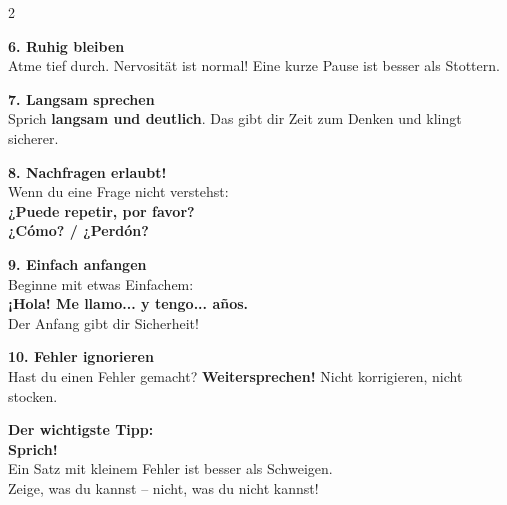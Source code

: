 \documentclass[11pt, a4paper]{article}
\newcommand{\seriftext}[1]{{\fontfamily{ppl}\selectfont #1}}
\newcommand{\es}[1]{\seriftext{\textbf{#1}}}
\newcommand{\tipp}[1]{\textcolor{spanischrot}{\textbf{#1}}}
\begin{document}
\begin{multicols}{2}
\begin{tippbox}
\tipp{6. Ruhig bleiben}\\[2pt]
Atme tief durch. Nervosität ist normal! Eine kurze Pause ist besser als Stottern.
\end{tippbox}

\begin{tippbox}
\tipp{7. Langsam sprechen}\\[2pt]
Sprich \textbf{langsam und deutlich}. Das gibt dir Zeit zum Denken und klingt sicherer.
\end{tippbox}

\begin{tippbox}
\tipp{8. Nachfragen erlaubt!}\\[2pt]
Wenn du eine Frage nicht verstehst:\\[2pt]
\es{¿Puede repetir, por favor?}\\
\es{¿Cómo? / ¿Perdón?}
\end{tippbox}

\begin{tippbox}
\tipp{9. Einfach anfangen}\\[2pt]
Beginne mit etwas Einfachem:\\[2pt]
\es{¡Hola! Me llamo... y tengo... años.}\\[2pt]
Der Anfang gibt dir Sicherheit!
\end{tippbox}

\begin{tippbox}
\tipp{10. Fehler ignorieren}\\[2pt]
Hast du einen Fehler gemacht? \textbf{Weitersprechen!} Nicht korrigieren, nicht stocken.
\end{tippbox}

\end{multicols}

\vspace{8pt}

\begin{successbox}
\begin{center}
\textbf{\large Der wichtigste Tipp:}\\[6pt]
{\Large \textbf{Sprich!}}\\[4pt]
Ein Satz mit kleinem Fehler ist besser als Schweigen.\\[2pt]
Zeige, was du kannst -- nicht, was du nicht kannst!
\end{center}
\end{successbox}

\vspace{8pt}
\end{document}
